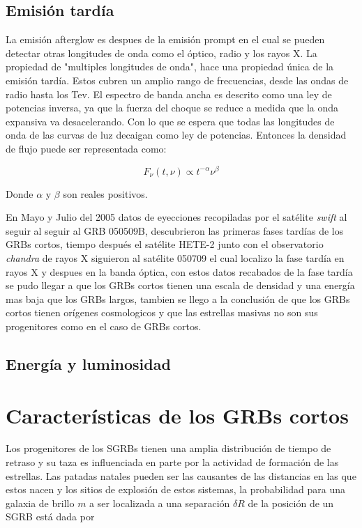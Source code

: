 \documentclass[12pt,a4paper]{book}
\begin{document}
\subsection{Emisión tardía}
La emisión afterglow es despues de la emisión prompt en el cual se pueden detectar otras longitudes de onda como el óptico, radio y los rayos X. %
La propiedad de "multiples longitudes de onda", hace una propiedad única de la emisión tardía. Estos cubren un amplio rango de frecuencias, desde las ondas de radio hasta los Tev. El espectro de banda ancha es descrito como una ley de potencias inversa, ya que la fuerza del choque se reduce a medida que la onda expansiva va desacelerando. Con lo que se espera que todas las longitudes de onda de las curvas de luz decaigan como ley de potencias. Entonces la densidad de flujo puede ser representada como:

\begin{equation}
F_{\nu}(t,\nu) \propto t^{-\alpha} \nu^{\beta}
\end{equation}

Donde $\alpha$ y $\beta$ son reales positivos.


 En Mayo y Julio del 2005 datos de eyecciones recopiladas por el satélite \emph{swift} al seguir al seguir al GRB 050509B, descubrieron las primeras fases tardías de los GRBs cortos, tiempo después el satélite HETE-2 junto con el observatorio \emph{chandra} de rayos X siguieron al satélite 050709 el cual localizo la fase tardía en rayos X y despues en la banda óptica, con estos datos recabados de la fase tardía se pudo llegar a que los GRBs cortos tienen una escala de densidad y una energía mas baja que los GRBs largos, tambien se llego a la conclusión de que los GRBs cortos tienen orígenes cosmologicos y que las estrellas masivas no son sus progenitores como en el caso de GRBs cortos.
\subsection{Energía y luminosidad}

%
\section{Características de los GRBs cortos}
Los progenitores de los SGRBs tienen una amplia distribución de tiempo de retraso y su taza es influenciada en parte por la actividad de formación de las estrellas. Las patadas natales pueden ser las causantes de las distancias en las que estos nacen y los sitios de explosión de estos sistemas, la probabilidad para una galaxia de brillo $m$  a ser localizada a una separación $\delta R$ de la posición de un SGRB está dada por 
\end{document}
